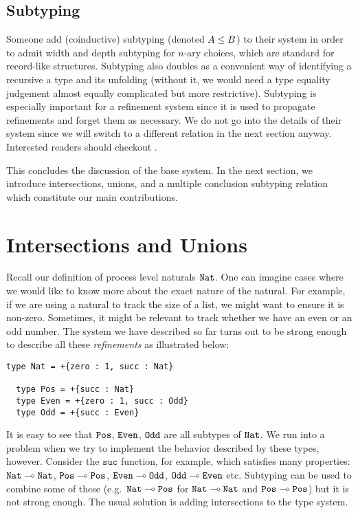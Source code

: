 \documentclass[a4paper,USenglish]{lipics-v2016}
\begin{document}
\subsection{Subtyping}
\label{original-subtyping}

Someone  add (coinductive) subtyping (denoted $A \le B$) to their system in order to admit width and depth subtyping for $n$-ary choices, which are standard for record-like structures. Subtyping also doubles as a convenient way of identifying a recursive a type and its unfolding (without it, we would need a type equality judgement almost equally complicated but more restrictive). Subtyping is especially important for a refinement system since it is used to propagate refinements and forget them as necessary. We do not go into the details of their system since we will switch to a different relation in the next section anyway. Interested readers should checkout .


This concludes the discussion of the base system. In the next section, we introduce intersections, unions, and a multiple conclusion subtyping relation which constitute our main contributions.


\section{Intersections and Unions}
\label{refinements}

Recall our definition of process level naturals $\mathtt{Nat}$. One can imagine cases where we would like to know more about the exact nature of the natural. For example, if we are using a natural to track the size of a list, we might want to ensure it is non-zero. Sometimes, it might be relevant to track whether we have an even or an odd number. The system we have described so far turns out to be strong enough to describe all these \emph{refinements} as illustrated below:

\begin{lstlisting}[language=krill, style=custom]
  type Nat = +{zero : 1, succ : Nat}

  type Pos = +{succ : Nat}
  type Even = +{zero : 1, succ : Odd}
  type Odd = +{succ : Even}
\end{lstlisting}

It is easy to see that $\mathtt{Pos}$, $\mathtt{Even}$, $\mathtt{Odd}$ are all subtypes of $\mathtt{Nat}$. We run into a problem when we try to implement the behavior described by these types, however. Consider the $\mathtt{suc}$ function, for example, which satisfies many properties: $\mathtt{Nat} \multimap \mathtt{Nat}$, $\mathtt{Pos} \multimap \mathtt{Pos}$, $\mathtt{Even} \multimap \mathtt{Odd}$, $\mathtt{Odd} \multimap \mathtt{Even}$ etc. Subtyping can be used to combine some of these (e.g.\ $\mathtt{Nat} \multimap \mathtt{Pos}$ for $\mathtt{Nat} \multimap \mathtt{Nat}$ and $\mathtt{Pos} \multimap \mathtt{Pos}$) but it is not strong enough. The usual solution is adding intersections to the type system.
\end{document}
